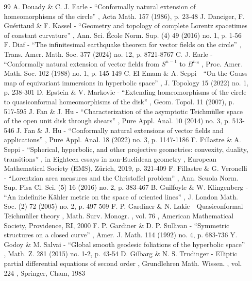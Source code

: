 \documentclass[11pt]{article}
\theoremstyle{plain}
\theoremstyle{definition}
\begin{document}
\begin{thebibliography}{99}
 A. Douady \& C. J. Earle - “Conformally natural extension of homeomorphisms of the circle” , Acta Math. 157 (1986), p. 23-48
 J. Danciger, F. Guéritaud \& F. Kassel - “Geometry and topology of complete Lorentz spacetimes of constant curvature” , Ann. Sci. École Norm. Sup. (4) 49 (2016) no. 1, p. 1-56
 F. Diaf - “The infinitesimal earthquake theorem for vector fields on the circle” , Trans. Amer. Math. Soc. 377 (2024) no. 12, p. 8721-8767
 C. J. Earle - “Conformally natural extension of vector fields from $S^{n-1}$ to $B^{n}$” , Proc. Amer. Math. Soc. 102 (1988) no. 1, p. 145-149
 C. El Emam \& A. Seppi - “On the Gauss map of equivariant immersions in hyperbolic space” , J. Topology 15 (2022) no. 1, p. 238-301
 D. Epstein \& V. Markovic - “Extending homeomorphisms of the circle to quasiconformal homeomorphisms of the disk” , Geom. Topol. 11 (2007), p. 517-595
 J. Fan \& J. Hu - “Characterization of the asymptotic Teichmüller space of the open unit disk through shears” , Pure Appl. Anal. 10 (2014) no. 3, p. 513-546
 J. Fan \& J. Hu - “Conformally natural extensions of vector fields and applications” , Pure Appl. Anal. 18 (2022) no. 3, p. 1147-1186
 F. Fillastre \& A. Seppi - “Spherical, hyperbolic, and other projective geometries: convexity, duality, transitions” , in Eighteen essays in non-Euclidean geometry , European Mathematical Society (EMS), Zürich, 2019, p. 321-409
 F. Fillastre \& G. Veronelli - “Lorentzian area measures and the Christoffel problem” , Ann. Scuola Norm. Sup. Pisa Cl. Sci. (5) 16 (2016) no. 2, p. 383-467
 B. Guilfoyle \& W. Klingenberg - “An indefinite Kähler metric on the space of oriented lines” , J. London Math. Soc. (2) 72 (2005) no. 2, p. 497-509
 F. P. Gardiner \& N. Lakic - Quasiconformal Teichmüller theory , Math. Surv. Monogr. , vol. 76 , American Mathematical Society, Providence, RI, 2000
 F. P. Gardiner \& D. P. Sullivan - “Symmetric structures on a closed curve” , Amer. J. Math. 114 (1992) no. 4, p. 683-736
 Y. Godoy \& M. Salvai - “Global smooth geodesic foliations of the hyperbolic space” , Math. Z. 281 (2015) no. 1-2, p. 43-54
 D. Gilbarg \& N. S. Trudinger - Elliptic partial differential equations of second order , Grundlehren Math. Wissen. , vol. 224 , Springer, Cham, 1983

\end{thebibliography}
\end{document}
